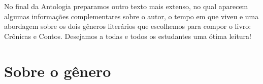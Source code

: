 No final da Antologia preparamos outro texto mais extenso, no qual
aparecem algumas informações complementares sobre o autor, o tempo em
que viveu e uma abordagem sobre os dois gêneros literários que
escolhemos para compor o livro: Crônicas e Contos. Desejamos a todas e
todos os estudantes uma ótima leitura!

\section{Sobre o gênero}